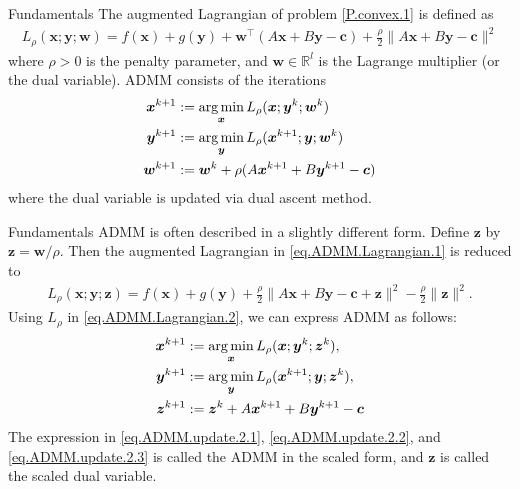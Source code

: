 \documentclass[8pt,red]{beamer}
\theoremstyle{plain}
\theoremstyle{definition}
\theoremstyle{remark}
\newcommand{\argmin}{\operatornamewithlimits{\mathrm{arg\,min}}}
\renewcommand{\Re}{\ensuremath{\mathbb{R}}}
\newcommand{\bi}[1]{\ensuremath{\boldsymbol{#1}}}
\begin{document}
\begin{frame}{Fundamentals}
The augmented Lagrangian of problem \eqref{P.convex.1} is defined as 
\begin{align}
  L_{\rho}(\bi{x};\bi{y};\bi{w}) 
  = f(\bi{x}) + g(\bi{y}) 
  + \bi{w}^{\top} (A \bi{x} + B \bi{y} - \bi{c}) 
  + \frac{\rho}{2} \| A \bi{x} + B \bi{y} - \bi{c} \|^{2} 
  \label{eq.ADMM.Lagrangian.1}
\end{align}
where $\rho > 0$ is the penalty parameter, 
and $\bi{w} \in \Re^{l}$ is the Lagrange multiplier (or the dual 
variable). 
ADMM consists of the iterations 
\begin{align}
  \bi{x}^{k+1} 
  &:= \argmin_{\bi{x}} L_{\rho}(\bi{x};\bi{y}^{k};\bi{w}^{k}) \\
  \bi{y}^{k+1} 
  &:= \argmin_{\bi{y}} L_{\rho}(\bi{x}^{k+1};\bi{y};\bi{w}^{k}) \\
  \bi{w}^{k+1} 
  &:= \bi{w}^{k} 
  + \rho (A \bi{x}^{k+1} + B \bi{y}^{k+1} - \bi{c}) 
\end{align}
where the dual variable is updated via dual ascent method.
\end{frame}

\begin{frame}{Fundamentals}
ADMM is often described in a slightly different form. 
Define $\bi{z}$ by $\bi{z} = \bi{w} / \rho$. 
Then the augmented Lagrangian in \eqref{eq.ADMM.Lagrangian.1} is reduced 
to 
\begin{align}
  L_{\rho}(\bi{x};\bi{y};\bi{z}) 
  = f(\bi{x}) + g(\bi{y}) 
  + \frac{\rho}{2} \| A \bi{x} + B \bi{y} - \bi{c} + \bi{z} \|^{2} 
  - \frac{\rho}{2} \| \bi{z} \|^{2} .
  \label{eq.ADMM.Lagrangian.2}
\end{align}
Using $L_{\rho}$ in \eqref{eq.ADMM.Lagrangian.2}, we can express ADMM as 
follows: 
\begin{align}
  \bi{x}^{k+1} 
  &:= \argmin_{\bi{x}} L_{\rho}(\bi{x};\bi{y}^{k};\bi{z}^{k}) , 
  \label{eq.ADMM.update.2.1} \\
  \bi{y}^{k+1} 
  &:= \argmin_{\bi{y}} L_{\rho}(\bi{x}^{k+1};\bi{y};\bi{z}^{k}) , 
  \label{eq.ADMM.update.2.2} \\
  \bi{z}^{k+1} 
  &:= \bi{z}^{k} + A \bi{x}^{k+1} + B \bi{y}^{k+1} - \bi{c} 
  \label{eq.ADMM.update.2.3}
\end{align}
The expression in \eqref{eq.ADMM.update.2.1}, \eqref{eq.ADMM.update.2.2}, 
and \eqref{eq.ADMM.update.2.3} is called the ADMM in the scaled form, 
and $\bi{z}$ is called the scaled dual variable.
\end{frame}
\end{document}
